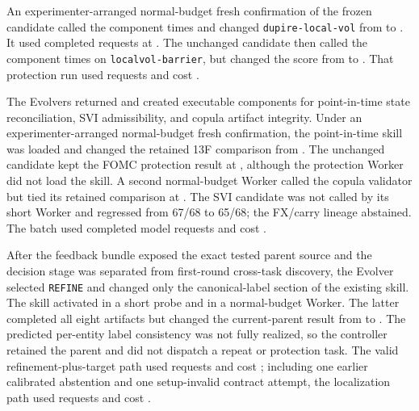 An experimenter-arranged normal-budget fresh confirmation of the frozen
candidate called the component \MTOneTargetComponentCalls{} times and changed
\texttt{dupire-local-vol} from \MTOneTargetComparator{} to
\MTOneTargetCandidate{}. It used \MTOneTargetRequests{} completed requests at
\MTOneTargetCost{}. The unchanged candidate then called the component
\MTOneProtectionComponentCalls{} times on \texttt{localvol-barrier}, but changed the
score from \MTOneProtectionComparator{} to
\MTOneProtectionCandidate{}. That protection run used
\MTOneProtectionRequests{} requests and cost \MTOneProtectionCost{}.

 The Evolvers returned \MTTwoDecisions{} and created executable
components for point-in-time state reconciliation, SVI admissibility, and
copula artifact integrity. Under an experimenter-arranged normal-budget fresh
confirmation, the point-in-time skill was loaded and changed the retained
13F comparison from \MTTwoPointTarget{}. The unchanged candidate kept the FOMC
protection result at \MTTwoPointProtection{}, although the protection Worker
did not load the skill. A second normal-budget Worker called the copula
validator but tied its retained comparison at \MTTwoCopulaTarget{}. The SVI
candidate was not called by its short Worker and regressed from 67/68 to 65/68;
the FX/carry lineage abstained. The batch used \MTTwoRequests{} completed model
requests and cost \MTTwoCost{}.


 After the feedback bundle exposed the exact
tested parent source and the decision stage was separated from first-round
cross-task discovery, the Evolver selected \texttt{REFINE} and changed only the
canonical-label section of the existing skill. The skill activated in a short
probe and in a normal-budget Worker. The latter completed all eight artifacts
but changed the current-parent result from \MTPointLineageParent{} to
\MTPointLineageCandidate{}. The predicted per-entity label consistency was not
fully realized, so the controller retained the parent and did not dispatch a
repeat or protection task. The valid refinement-plus-target path used
\MTPointLineageValidRequests{} requests and cost \MTPointLineageValidCost{};
including one earlier calibrated abstention and one setup-invalid contract
attempt, the localization path used \MTPointLineagePathRequests{} requests and
cost \MTPointLineagePathCost{}.

